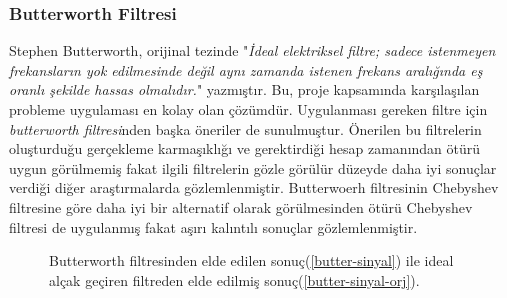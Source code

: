 \documentclass[a4paper, 12pt]{article}
\begin{document}
\subsubsection{Butterworth Filtresi}{\label{butterworth-filtre}}


Stephen Butterworth, orijinal tezinde "\textit{İdeal elektriksel filtre; sadece istenmeyen frekansların yok edilmesinde değil aynı zamanda istenen frekans aralığında eş oranlı şekilde hassas olmalıdır.}" yazmıştır.\cite{butterworth} Bu, proje kapsamında karşılaşılan probleme uygulaması en kolay olan çözümdür. Uygulanması gereken filtre için \textit{butterworth filtresi}nden başka öneriler\cite{Davis2014VisualMic} de sunulmuştur. Önerilen bu filtrelerin oluşturduğu gerçekleme karmaşıklığı ve gerektirdiği hesap zamanından ötürü uygun görülmemiş fakat ilgili filtrelerin gözle görülür düzeyde daha iyi sonuçlar verdiği diğer araştırmalarda gözlemlenmiştir.  Butterwoerh filtresinin Chebyshev filtresine göre daha iyi bir alternatif olarak görülmesinden ötürü Chebyshev filtresi de uygulanmış fakat aşırı kalıntılı sonuçlar gözlemlenmiştir. 

\begin{figure}[h]
	\centering
{}



\label{butter-stop}
\caption{ Butterworth filtresinden elde edilen sonuç(\ref{butter-sinyal}) ile ideal alçak geçiren filtreden elde edilmiş sonuç(\ref{butter-sinyal-orj}). }
\end{figure}
\end{document}
